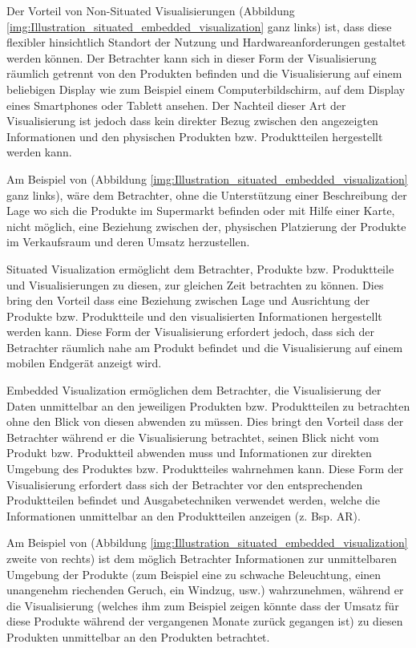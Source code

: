 Der Vorteil von Non-Situated Visualisierungen (Abbildung \ref{img:Illustration_situated_embedded_visualization} ganz links) ist, dass diese flexibler hinsichtlich Standort 
der Nutzung und Hardwareanforderungen gestaltet werden können. Der Betrachter kann sich in dieser Form der Visualisierung räumlich getrennt von den Produkten befinden und die Visualisierung 
auf einem beliebigen Display wie zum Beispiel einem Computerbildschirm, auf dem Display eines Smartphones oder Tablett ansehen. Der Nachteil dieser Art der Visualisierung ist jedoch dass kein 
direkter Bezug zwischen den angezeigten Informationen und den physischen Produkten bzw. Produktteilen hergestellt werden kann. 

Am Beispiel von (Abbildung \ref{img:Illustration_situated_embedded_visualization} ganz links), wäre dem Betrachter, ohne die Unterstützung einer Beschreibung der Lage wo sich die Produkte im 
Supermarkt befinden oder mit Hilfe einer Karte, nicht möglich, eine Beziehung zwischen der, physischen Platzierung der Produkte im Verkaufsraum und deren Umsatz herzustellen.

Situated Visualization ermöglicht dem Betrachter, Produkte bzw. Produktteile und Visualisierungen zu diesen, zur gleichen Zeit betrachten zu können. Dies bring den Vorteil dass eine Beziehung 
zwischen Lage und Ausrichtung der Produkte bzw. Produktteile und den visualisierten Informationen hergestellt werden kann. Diese Form der Visualisierung erfordert jedoch, dass sich 
der Betrachter räumlich nahe am Produkt befindet und die Visualisierung auf einem mobilen Endgerät anzeigt wird.

Embedded Visualization ermöglichen dem Betrachter, die Visualisierung der Daten unmittelbar an den jeweiligen Produkten bzw. Produktteilen zu betrachten ohne den Blick von diesen abwenden zu müssen. 
Dies bringt den Vorteil dass der Betrachter während er die Visualisierung betrachtet, seinen Blick nicht vom Produkt bzw. Produktteil abwenden muss und Informationen zur direkten Umgebung des Produktes bzw. Produktteiles wahrnehmen kann. Diese Form der Visualisierung erfordert dass sich der Betrachter vor den entsprechenden Produktteilen befindet und Ausgabetechniken verwendet werden, welche die Informationen unmittelbar an den 
Produktteilen anzeigen (z. Bsp. AR).

Am Beispiel von (Abbildung \ref{img:Illustration_situated_embedded_visualization} zweite von rechts) ist dem möglich Betrachter Informationen zur unmittelbaren Umgebung der Produkte (zum Beispiel eine zu schwache Beleuchtung, einen unangenehm riechenden Geruch, ein Windzug, usw.) wahrzunehmen, während er die Visualisierung (welches ihm zum Beispiel zeigen könnte dass der Umsatz für diese Produkte während der vergangenen Monate zurück gegangen ist) zu diesen Produkten unmittelbar an den Produkten betrachtet.  

